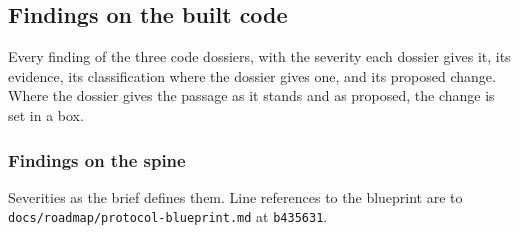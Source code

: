 \subsection{Findings on the built code}\label{sec:gen-findings-code}

Every finding of the three code dossiers, with the severity each dossier gives it, its evidence, its classification where the dossier gives one, and its proposed change. Where the dossier gives the passage as it stands and as proposed, the change is set in a box.

\subsubsection{Findings on the spine}\label{sec:gen-findings-spine}

\par{}\par

Severities as the brief defines them. Line references to the blueprint are to \texttt{d\allowbreak{}o\allowbreak{}c\allowbreak{}s\allowbreak{}/\allowbreak{}r\allowbreak{}o\allowbreak{}a\allowbreak{}d\allowbreak{}m\allowbreak{}a\allowbreak{}p\allowbreak{}/\allowbreak{}p\allowbreak{}r\allowbreak{}o\allowbreak{}t\allowbreak{}o\allowbreak{}c\allowbreak{}o\allowbreak{}l\allowbreak{}-{}\allowbreak{}b\allowbreak{}l\allowbreak{}u\allowbreak{}e\allowbreak{}p\allowbreak{}r\allowbreak{}i\allowbreak{}n\allowbreak{}t\allowbreak{}.\allowbreak{}m\allowbreak{}d} at \texttt{b435631}.


